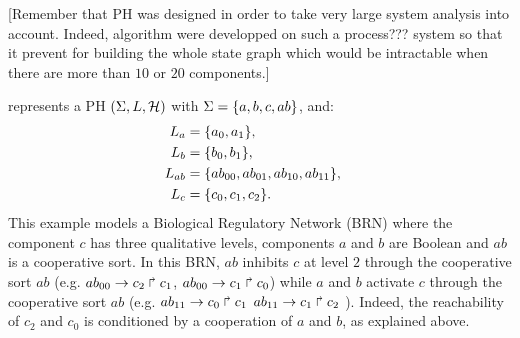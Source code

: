 [Remember that PH was designed in order to take very large system analysis into account. Indeed, algorithm were developped on such a
process??? system so that it prevent for building the whole state graph which would be intractable when there are more than $10$ or    %
$20$ components.]

\begin{example}
 represents a PH $(\Sigma,L,\mathcal{H})$ with $\Sigma = \{a,b,c,ab\}$, and:
\begin{align*}
L_a &= \{a_0,a_1\},\\
L_b &= \{b_0, b_1\},\\
L_{ab} &= \{ab_{00}, ab_{01}, ab_{10}, ab_{11}\},&\\
L_c &= \{c_0, c_1, c_2\}.
\end{align*}
This example models a Biological Regulatory Network (BRN) where the component $c$ has three qualitative levels, components $a$ and $b$ are Boolean and $ab$ is a cooperative sort.
In this BRN, $ab$ inhibits $c$ at level $2$ through the cooperative sort $ab$ (e.g. $ab_{00}\rightarrow c_2\Rsh c_1$, $ab_{00}\rightarrow c_1\Rsh c_0$) while $a$ and $b$ activate $c$  
through the cooperative sort $ab$ (e.g. $ab_{11}\rightarrow c_0\Rsh c_1$ $ab_{11}\rightarrow c_1\Rsh c_2$ ). Indeed, the reachability of $c_2$ and $c_0$ 
is conditioned by a cooperation of $a$ and $b$, as explained above.

\begin{figure}[!t]
\begin{minipage}{0.3\linewidth}
\centering
{}
\end{minipage}
\begin{minipage}{0.7\linewidth}
\centering
{}
\end{minipage}
\end{figure}
\end{example}
